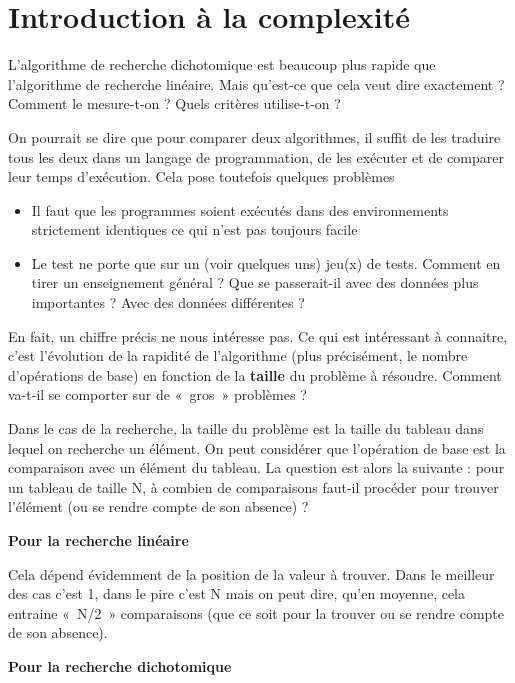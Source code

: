 \section{Introduction à la complexité}

	L’algorithme de recherche dichotomique est beaucoup plus rapide que
	l’algorithme de recherche linéaire. Mais qu’est-ce que cela veut dire
	exactement ? Comment le mesure-t-on ? Quels critères utilise-t-on ?

	On pourrait se dire que pour comparer deux algorithmes, il suffit de les
	traduire tous les deux dans un langage de programmation, de les
	exécuter et de comparer leur temps d’exécution. Cela pose toutefois
	quelques problèmes
			
	\liststyleListv
	\begin{itemize}
		\item 
			Il faut que les programmes soient exécutés dans des environnements
			strictement identiques ce qui n’est pas toujours facile
		\item 
			Le test ne porte que sur un (voir quelques uns) jeu(x) de tests. Comment
			en tirer un enseignement général ? Que se passerait-il avec des données
			plus importantes ? Avec des données différentes ?
	\end{itemize}
	
	En fait, un chiffre précis ne nous intéresse pas. Ce qui est intéressant
	à connaitre, c’est l’évolution de la rapidité de l’algorithme (plus
	précisément, le nombre d’opérations de base) en fonction de la
	\textbf{taille} du problème à résoudre. Comment va-t-il se comporter
	sur de «~gros~» problèmes ?

	Dans le cas de la recherche, la taille du problème est la taille du
	tableau dans lequel on recherche un élément. On peut considérer que
	l’opération de base est la comparaison avec un élément du tableau. La
	question est alors la suivante : pour un tableau de taille N, à combien
	de comparaisons faut-il procéder pour trouver l’élément (ou se rendre
	compte de son absence) ?

	{\bfseries
	Pour la recherche linéaire}

		Cela dépend évidemment de la position de la valeur à trouver. Dans le
		meilleur des cas c’est 1, dans le pire c’est N mais on peut dire, qu’en
		moyenne, cela entraine «~N/2~» comparaisons (que ce soit pour la
		trouver ou se rendre compte de son absence).

	{\bfseries
	Pour la recherche dichotomique}

